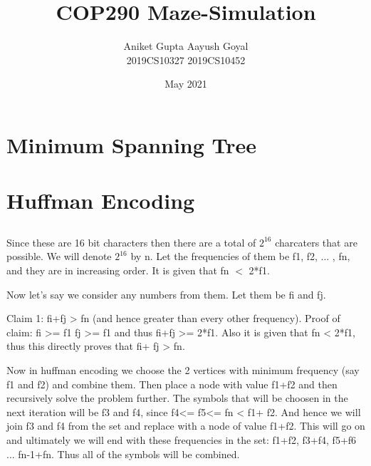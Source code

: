 \documentclass{article}
\title{COP290 Maze-Simulation}
\date{May 2021}
\author{Aniket Gupta \hspace{2cm}  Aayush Goyal \\
    2019CS10327 \hspace{2.3cm} 2019CS10452}
\begin{document}
\maketitle

\section{Minimum Spanning Tree}
\subsection{}
\subsection{}

\section{Huffman Encoding}
\subsection{}

\subsection{}

Since these are 16 bit characters then there are a total of $2^{16}$ charcaters that are possible. We will denote $2^{16}$ by n. Let the frequencies of them be f1, f2, ... , fn, and they are in increasing order. It is given that fn $<$ 2*f1.

Now let's say we consider any numbers from them. Let them be fi and fj. 

Claim 1: fi+fj > fn (and hence greater than every other frequency). 
Proof of claim: fi >= f1
fj >= f1
and thus fi+fj >= 2*f1. 
Also it is given that fn < 2*f1, thus this directly proves that fi+ fj > fn. 

Now in huffman encoding we choose the 2 vertices with minimum frequency (say f1 and f2) and combine them. Then place a node with value f1+f2 and then recursively solve the problem further. The symbols that will be choosen in the next iteration will be f3 and f4, since f4<= f5<= fn < f1+ f2. And hence we will join f3 and f4 from the set and replace with a node of value f1+f2. This will go on and ultimately we will end with these frequencies in the set: f1+f2, f3+f4, f5+f6 ... fn-1+fn. Thus all of the symbols will be combined.
\end{document}
